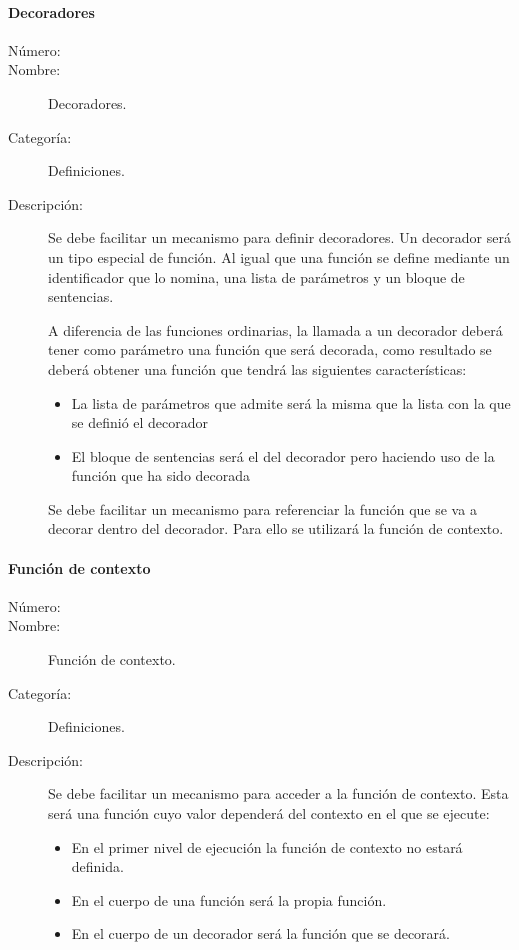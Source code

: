 \paragraph{Decoradores}
\begin{framed}
	\begin{description}
		\item [Número:] \cn
		\item [Nombre:] Decoradores.
		\item [Categoría:] Definiciones.
		\item [Descripción:] Se debe facilitar un mecanismo para definir decoradores. Un decorador será un tipo especial de función.
      Al igual que una función se define mediante un identificador que lo nomina, una lista de parámetros y un bloque de sentencias. 
      
      A diferencia de las funciones ordinarias, la llamada a un decorador deberá tener como parámetro una función que será decorada, como
      resultado se deberá obtener una función que tendrá las siguientes características:
      
      \begin{itemize}
         \item La lista de parámetros que admite será la misma que la lista con la que se definió el decorador
         \item El bloque de sentencias será el del decorador pero haciendo uso de la función que ha sido decorada
      \end{itemize}
      
      Se debe facilitar un mecanismo para referenciar la función que se va a decorar dentro del decorador. Para ello
      se utilizará la función de contexto.
	\end{description}
\end{framed}

\paragraph{Función de contexto}
\begin{framed}
	\begin{description}
		\item [Número:] \cn
		\item [Nombre:] Función de contexto.
		\item [Categoría:] Definiciones.
		\item [Descripción:] Se debe facilitar un mecanismo para acceder a la función de contexto. Esta será una función 
      cuyo valor dependerá del contexto en el que se ejecute:
      \begin{itemize}
         \item En el primer nivel de ejecución la función de contexto no estará definida. 
         \item En el cuerpo de una función será la propia función.  
         \item En el cuerpo de un decorador será la función que se decorará.
      \end{itemize}
	\end{description}
\end{framed}



